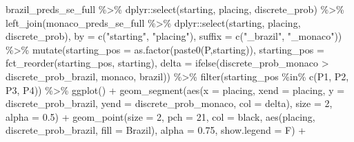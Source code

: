 \documentclass[
]{book}
\newenvironment{Shaded}{\begin{snugshade}}{\end{snugshade}}
\newcommand{\AttributeTok}[1]{\textcolor[rgb]{0.77,0.63,0.00}{#1}}
\newcommand{\DecValTok}[1]{\textcolor[rgb]{0.00,0.00,0.81}{#1}}
\newcommand{\FloatTok}[1]{\textcolor[rgb]{0.00,0.00,0.81}{#1}}
\newcommand{\FunctionTok}[1]{\textcolor[rgb]{0.00,0.00,0.00}{#1}}
\newcommand{\NormalTok}[1]{#1}
\newcommand{\SpecialCharTok}[1]{\textcolor[rgb]{0.00,0.00,0.00}{#1}}
\newcommand{\StringTok}[1]{\textcolor[rgb]{0.31,0.60,0.02}{#1}}
\begin{document}
\begin{Shaded}
\begin{Highlighting}[]
\NormalTok{brazil\_preds\_se\_full }\SpecialCharTok{\%\textgreater{}\%}
\NormalTok{  dplyr}\SpecialCharTok{::}\FunctionTok{select}\NormalTok{(starting, placing, discrete\_prob) }\SpecialCharTok{\%\textgreater{}\%}
  \FunctionTok{left\_join}\NormalTok{(monaco\_preds\_se\_full }\SpecialCharTok{\%\textgreater{}\%}
\NormalTok{  dplyr}\SpecialCharTok{::}\FunctionTok{select}\NormalTok{(starting, placing, discrete\_prob), }\AttributeTok{by =} \FunctionTok{c}\NormalTok{(}\StringTok{"starting"}\NormalTok{, }\StringTok{"placing"}\NormalTok{), }\AttributeTok{suffix =} \FunctionTok{c}\NormalTok{(}\StringTok{"\_brazil"}\NormalTok{, }\StringTok{"\_monaco"}\NormalTok{)) }\SpecialCharTok{\%\textgreater{}\%}
  \FunctionTok{mutate}\NormalTok{(}\AttributeTok{starting\_pos =} \FunctionTok{as.factor}\NormalTok{(}\FunctionTok{paste0}\NormalTok{(}\StringTok{\textquotesingle{}P\textquotesingle{}}\NormalTok{,starting)),}
         \AttributeTok{starting\_pos =} \FunctionTok{fct\_reorder}\NormalTok{(starting\_pos, starting),}
         \AttributeTok{delta =} \FunctionTok{ifelse}\NormalTok{(discrete\_prob\_monaco }\SpecialCharTok{\textgreater{}}\NormalTok{ discrete\_prob\_brazil, }\StringTok{\textquotesingle{}monaco\textquotesingle{}}\NormalTok{, }\StringTok{\textquotesingle{}brazil\textquotesingle{}}\NormalTok{)) }\SpecialCharTok{\%\textgreater{}\%}
  \FunctionTok{filter}\NormalTok{(starting\_pos }\SpecialCharTok{\%in\%} \FunctionTok{c}\NormalTok{(}\StringTok{\textquotesingle{}P1\textquotesingle{}}\NormalTok{, }\StringTok{\textquotesingle{}P2\textquotesingle{}}\NormalTok{, }\StringTok{\textquotesingle{}P3\textquotesingle{}}\NormalTok{, }\StringTok{\textquotesingle{}P4\textquotesingle{}}\NormalTok{)) }\SpecialCharTok{\%\textgreater{}\%}
  \FunctionTok{ggplot}\NormalTok{() }\SpecialCharTok{+}
  \FunctionTok{geom\_segment}\NormalTok{(}\FunctionTok{aes}\NormalTok{(}\AttributeTok{x =}\NormalTok{ placing, }\AttributeTok{xend =}\NormalTok{ placing, }\AttributeTok{y =}\NormalTok{ discrete\_prob\_brazil, }\AttributeTok{yend =}\NormalTok{ discrete\_prob\_monaco, }\AttributeTok{col =}\NormalTok{ delta),}
               \AttributeTok{size =} \DecValTok{2}\NormalTok{, }\AttributeTok{alpha =} \FloatTok{0.5}\NormalTok{) }\SpecialCharTok{+}
  \FunctionTok{geom\_point}\NormalTok{(}\AttributeTok{size =} \DecValTok{2}\NormalTok{, }\AttributeTok{pch =} \DecValTok{21}\NormalTok{, }\AttributeTok{col =} \StringTok{\textquotesingle{}black\textquotesingle{}}\NormalTok{, }\FunctionTok{aes}\NormalTok{(placing, discrete\_prob\_brazil, }\AttributeTok{fill =} \StringTok{\textquotesingle{}Brazil\textquotesingle{}}\NormalTok{), }\AttributeTok{alpha =} \FloatTok{0.75}\NormalTok{, }\AttributeTok{show.legend =}\NormalTok{ F) }\SpecialCharTok{+}

\end{Highlighting}
\end{Shaded}
\end{document}
